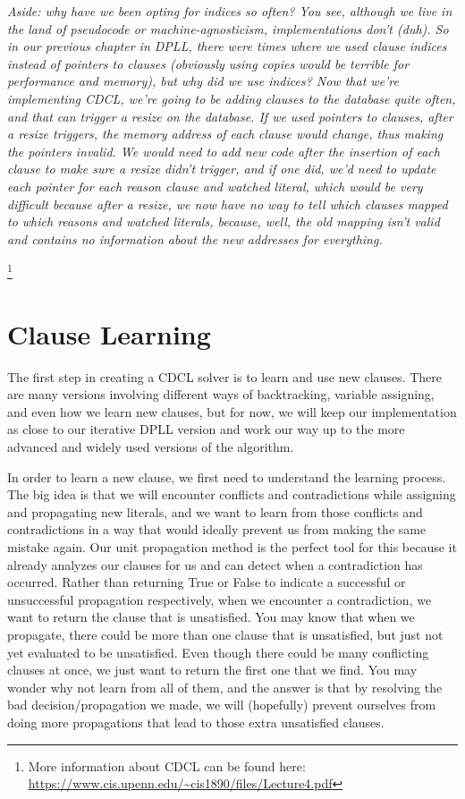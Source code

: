\documentclass[oneside]{book}
\begin{document}
\textit{Aside: why have we been opting for indices so often? You see, although
we live in the land of pseudocode or machine-agnosticism, implementations don't
(duh). So in our previous chapter in DPLL, there were times where we used clause 
indices instead of pointers to clauses (obviously using copies would be terrible 
for performance and memory), but why did we use indices? Now that we're implementing 
CDCL, we're going to be adding clauses to the database quite often, and that can 
trigger a resize on the database. If we used pointers to clauses, after a resize 
triggers, the memory address of each clause would change, thus making the pointers 
invalid. We would need to add new code after the insertion of each clause to make 
sure a resize didn't trigger, and if one did, we'd need to update each pointer for 
each reason clause and watched literal, which would be very difficult because after 
a resize, we now have no way to tell which clauses mapped to which reasons and watched 
literals, because, well, the old mapping isn't valid and contains no information about 
the new addresses for everything.
}

\footnote{More information about CDCL can be found here: 
    \url{https://www.cis.upenn.edu/~cis1890/files/Lecture4.pdf}}
\section{Clause Learning}

The first step in creating a CDCL solver is to learn and use new clauses. There are 
many versions involving different ways of backtracking, variable assigning, and even 
how we learn new clauses, but for now, we will keep our implementation as close to 
our iterative DPLL version and work our way up to the more advanced and widely used 
versions of the algorithm. 

In order to learn a new clause, we first need to understand the learning process. 
The big idea is that we will encounter conflicts and contradictions while assigning 
and propagating new literals, and we want to learn from those conflicts and contradictions 
in a way that would ideally prevent us from making the same mistake again. Our unit 
propagation method is the perfect tool for this because it already analyzes our clauses 
for us and can detect when a contradiction has occurred. Rather than returning True or 
False to indicate a successful or unsuccessful propagation respectively, when we 
encounter a contradiction, we want to return the clause that is unsatisfied. You may know that
when we propagate, there could be more than one clause that is unsatisfied, but just not 
yet evaluated to be unsatisfied. Even though there could be many conflicting clauses at
once, we just want to return the first one that we find. You may wonder why not learn from 
all of them, and the answer is that by resolving the bad decision/propagation we made, 
we will (hopefully) prevent ourselves from doing more propagations that lead to those 
extra unsatisfied clauses.
\end{document}
